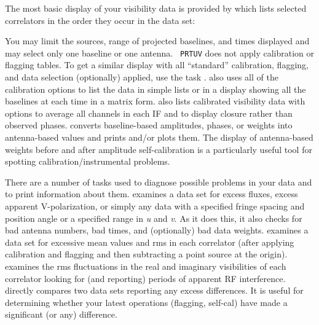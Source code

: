      The most basic display of your visibility data is provided by
{\tt {}} which lists selected correlators in the order they
occur in the data set:

\noindent You may limit the sources, range of projected baselines, and
times displayed and may select only one baseline or one antenna.  {\tt
PRTUV} does not apply calibration or flagging tables.  To get a
similar display with all ``standard'' calibration, flagging, and data
selection (optionally) applied, use the task {\tt {}}\@.
{\tt {}} also uses all of the calibration options to list
the data in simple lists or in a display showing all the baselines at
each time in a matrix form.  {\tt {}} also lists calibrated
visibility data with options to average all channels in each IF and to
display closure rather than observed phases.  {\tt {}}
converts baseline-based amplitudes, phases, or weights into
antenna-based values and prints and/or plots them.  The display of
antenna-based weights before and after amplitude self-calibration is a
particularly useful tool for spotting calibration/instrumental
problems.

     There are a number of tasks used to diagnose possible problems in
your data and to print information about them.  {\tt {}}
examines a data set for excess fluxes, excess apparent V-polarization,
or simply any data with a specified fringe spacing and position angle
or a specified range in {\it u\/} and {\it v\/}. As it does this, it
also checks for bad antenna numbers, bad times, and (optionally) bad
data weights. {\tt {}} examines a data set for excessive
mean values and rms in each correlator (after applying calibration and
flagging and then subtracting a point source at the origin).  {\tt
{}} examines the rms fluctuations in the real and imaginary
visibilities of each correlator looking for (and reporting) periods of
apparent RF interference.  {\tt {}} directly compares two
data sets reporting any excess differences.  It is useful for
determining whether your latest operations (flagging, self-cal) have
made a significant (or any) difference.


